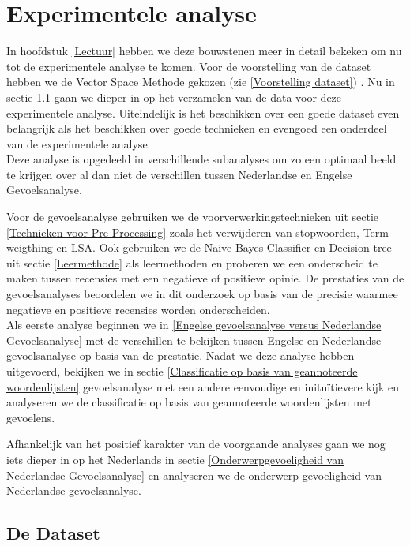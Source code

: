 \chapter{Experimentele analyse}\label{Experiment}

In hoofdstuk \ref{Lectuur} hebben we deze bouwstenen meer in detail bekeken om nu tot de experimentele analyse te komen. Voor de voorstelling van de dataset hebben we de Vector Space Methode gekozen (zie \ref{Voorstelling dataset}) . Nu in sectie \ref{De Dataset} gaan we dieper in op het verzamelen van de data voor deze experimentele analyse. Uiteindelijk is het beschikken over een goede dataset even belangrijk als het beschikken over goede technieken en evengoed een onderdeel van de experimentele analyse.\\
Deze analyse is opgedeeld in verschillende subanalyses om zo een optimaal beeld te krijgen over al dan niet de verschillen tussen Nederlandse en Engelse Gevoelsanalyse. 

Voor de gevoelsanalyse gebruiken we de voorverwerkingstechnieken uit sectie \ref{Technieken voor Pre-Processing} zoals het verwijderen van stopwoorden, Term weigthing en LSA. Ook gebruiken we de Naive Bayes Classifier en Decision tree uit sectie \ref{Leermethode} als leermethoden en proberen we een onderscheid te maken tussen recensies met een negatieve of positieve opinie. De prestaties van de gevoelsanalyses beoordelen we in dit onderzoek op basis van de precisie waarmee negatieve en positieve recensies worden onderscheiden.\\

Als eerste analyse beginnen we in \ref{Engelse gevoelsanalyse versus Nederlandse Gevoelsanalyse} met de verschillen te bekijken tussen Engelse en Nederlandse gevoelsanalyse op basis van de prestatie. Nadat we deze analyse hebben uitgevoerd, bekijken we in sectie \ref{Classificatie op basis van geannoteerde woordenlijsten} gevoelsanalyse met een andere eenvoudige en initu\"itievere kijk en analyseren we de classificatie op basis van geannoteerde woordenlijsten met gevoelens.

Afhankelijk van het positief karakter van de voorgaande analyses gaan we nog iets dieper in op het Nederlands in sectie \ref{Onderwerpgevoeligheid van Nederlandse Gevoelsanalyse} en analyseren we de onderwerp-gevoeligheid van Nederlandse gevoelsanalyse.

\section{De Dataset}\label{De Dataset}

